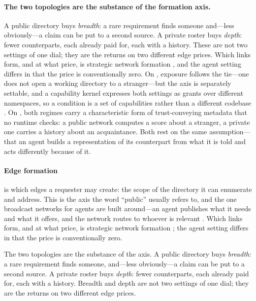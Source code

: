 \paragraph{The two topologies are the substance of the formation axis.} A public directory
buys \emph{breadth}: a rare requirement finds someone and---less obviously---a claim can be
put to a second source. A private roster buys \emph{depth}: fewer counterparts, each
already paid for, each with a history. These are not two settings of one dial; they are the
returns on two different edge prices. Which links form, and at what price, is strategic
network formation \citep{jackson1996}, and the agent setting differs in that the price is
conventionally zero. On , exposure follows the tie---one does not open a
working directory to a stranger---but the axis is separately settable, and a capability
kernel expresses both settings as grants over different namespaces, so a condition is a set
of capabilities rather than a different codebase \citep{a2a2025}. On , both
regimes carry a characteristic form of trust-conveying metadata that no runtime checks: a
public network computes a score about a stranger, a private one carries a history about an
acquaintance. Both rest on the same assumption---that an agent builds a representation of
its counterpart from what it is told and acts differently because of it.

\else
\paragraph{Edge formation} is which edges a requester may create: the scope of the
directory it can enumerate and address. This is the axis the word ``public'' usually
refers to, and the one broadcast networks for agents are built around---an agent
publishes what it needs and what it offers, and the network routes to whoever is
relevant \citep{eigenflux}. Which links form, and at what price, is strategic network
formation \citep{jackson1996}; the agent setting differs in that the price is
conventionally zero.

The two topologies are the substance of the axis. A public directory buys
\emph{breadth}: a rare requirement finds someone, and---less obviously---a claim can be
put to a second source. A private roster buys \emph{depth}: fewer counterparts, each
already paid for, each with a history. Breadth and depth are not two settings of one
dial; they are the returns on two different edge prices.

